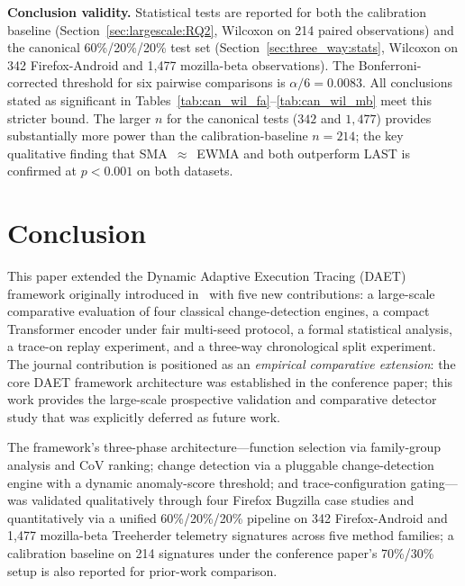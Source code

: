 \documentclass[pdflatex,sn-nature]{sn-jnl}
\theoremstyle{thmstyleone}%
\begin{document}
\textbf{Conclusion validity.}
Statistical tests are reported for both the calibration baseline
(Section~\ref{sec:largescale:RQ2}, Wilcoxon on 214 paired observations)
and the canonical 60\%/20\%/20\% test set
(Section~\ref{sec:three_way:stats}, Wilcoxon on 342 Firefox-Android
and 1{,}477 mozilla-beta observations).
The Bonferroni-corrected threshold for six pairwise comparisons is
$\alpha/6 = 0.0083$.
All conclusions stated as significant in
Tables~\ref{tab:can_wil_fa}--\ref{tab:can_wil_mb}
meet this stricter bound.
The larger $n$ for the canonical tests ($342$ and $1{,}477$)
provides substantially more power than the calibration-baseline $n=214$;
the key qualitative finding that SMA~$\approx$~EWMA and both outperform
LAST is confirmed at $p < 0.001$ on both datasets.

\section{Conclusion}\label{sec:conclusion}

This paper extended the Dynamic Adaptive Execution Tracing (DAET) framework
originally introduced in~\cite{10197790} with five new contributions:
a large-scale comparative evaluation of four classical change-detection engines,
a compact Transformer encoder under fair multi-seed protocol, a formal
statistical analysis, a trace-on replay experiment, and a
three-way chronological split experiment.
The journal contribution is positioned as an \emph{empirical comparative
extension}: the core DAET framework architecture was established in the
conference paper; this work provides the large-scale prospective validation
and comparative detector study that was explicitly deferred as future work.

The framework's three-phase architecture---function selection via
family-group analysis and CoV ranking; change detection via a pluggable
change-detection engine with a dynamic anomaly-score threshold; and
trace-configuration gating---was
validated qualitatively through four Firefox Bugzilla case studies and
quantitatively via a unified 60\%/20\%/20\% pipeline on 342 Firefox-Android
and 1{,}477 mozilla-beta Treeherder telemetry signatures across five method
families; a calibration baseline on 214 signatures under the conference paper's
70\%/30\% setup is also reported for prior-work comparison.
\end{document}
